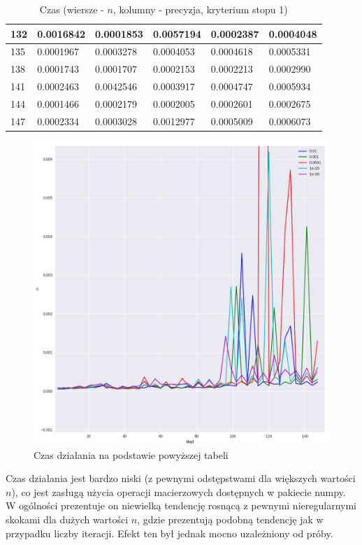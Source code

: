 \documentclass{article}
\begin{document}
\begin{table}[H]
\begin{tabular}{|l|l|l|l|l|l|}
132 & 0.0016842 & 0.0001853 & 0.0057194 & 0.0002387 & 0.0004048 \\ \hline
135 & 0.0001967 & 0.0003278 & 0.0004053 & 0.0004618 & 0.0005331 \\ \hline
138 & 0.0001743 & 0.0001707 & 0.0002153 & 0.0002213 & 0.0002990 \\ \hline
141 & 0.0002463 & 0.0042546 & 0.0003917 & 0.0004747 & 0.0005934 \\ \hline
144 & 0.0001466 & 0.0002179 & 0.0002005 & 0.0002601 & 0.0002675 \\ \hline
147 & 0.0002334 & 0.0003028 & 0.0012977 & 0.0005009 & 0.0006073 \\ \hline
\end{tabular}
\caption{Czas (wiersze - $n$, kolumny - precyzja, kryterium stopu 1)}
\end{table}

\begin{figure}[H]
    \centering
    \includegraphics[width=\textwidth]{img/plot_5.png}
    \caption{Czas działania na podstawie powyższej tabeli}
\end{figure}

Czas działania jest bardzo niski (z pewnymi odstępstwami dla większych wartości $n$), co jest zasługą użycia operacji
macierzowych dostępnych w pakiecie numpy. W ogólności prezentuje on niewielką tendencję rosnącą z pewnymi nieregularnymi
skokami dla dużych wartości $n$, gdzie prezentują podobną tendencję jak w przypadku liczby iteracji. 
Efekt ten był jednak mocno uzależniony od próby.
\end{document}
